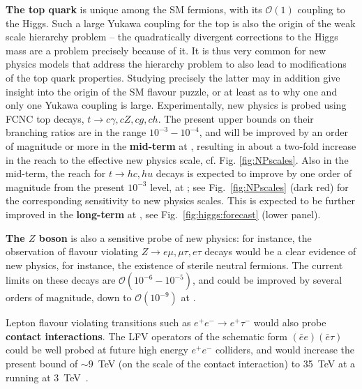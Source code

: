 \textbf{The top quark} is unique among the SM fermions, with its ${\mathcal O}(1)$ coupling to the Higgs. Such a large Yukawa coupling for the top is also the origin of the weak scale hierarchy problem -- the quadratically divergent corrections to the Higgs mass are a problem precisely because of it. 
It is thus very common for new physics models that address the  hierarchy problem to also lead to modifications of the top quark properties.  
Studying precisely the latter may in addition give insight into the origin of the SM flavour puzzle, or at least as to why one and only one Yukawa coupling is large.  Experimentally, new physics is probed using FCNC top decays, $t\to c\gamma, cZ, cg, ch$. 
The present upper bounds on their branching ratios are in the range $10^{-3}-10^{-4}$, and will be improved by an order of magnitude or more in the {\bf mid-term} at \HLLHC, resulting in about a two-fold increase in the reach to the effective new physics scale, cf. Fig. \ref{fig:NPscales}.
Also in the mid-term, the reach for  $t\to hc, hu$ decays is expected to improve  by one order of magnitude from the present $10^{-3}$ level,   at \HLLHC; see Fig.~\ref{fig:NPscales} (dark red) for the corresponding sensitivity to new physics scales. This is expected to be further improved in the {\bf long-term}  at \FCChh, see Fig.~\ref{fig:higgs:forecast} (lower panel).

\textbf{The $Z$ boson} is also a sensitive probe of new physics: for instance, the observation of flavour violating $Z\to e\mu, \mu\tau, e\tau$ decays would be a clear evidence of new physics, for instance, the existence of sterile neutral fermions. The current limits on these decays are ${\mathcal O}(10^{-6}-10^{-5})$, and could be improved by several orders of magnitude, down to ${\mathcal O}(10^{-9})$ at \FCCee \cite{Abada:2019lih}. 


Lepton flavour violating transitions such as $e^+e^-\to e^+\tau^-$ would also probe \textbf{contact interactions}. The LFV operators of the schematic form $(\bar e e)(\bar e \tau)$ could be well probed at future high energy $e^+e^-$ colliders, and would increase the present bound of $\sim9$~TeV (on the scale of the contact interaction) to 35~TeV at a \CLIC running at 3~TeV~\cite{deBlas:2018mhx}. 


